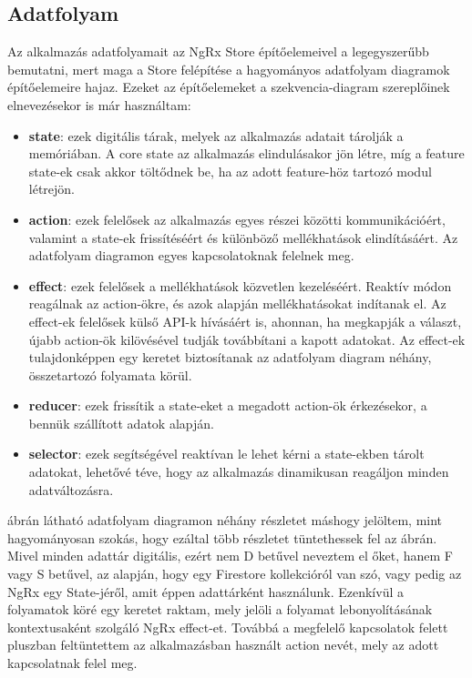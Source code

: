 \documentclass[a4paper,12pt]{report}
\begin{document}
\subsection{Adatfolyam}

Az alkalmazás adatfolyamait az NgRx Store építőelemeivel a legegyszerűbb bemutatni, mert maga a Store felépítése a hagyományos adatfolyam diagramok építőelemeire hajaz. Ezeket az építőelemeket a szekvencia-diagram szereplőinek elnevezésekor is már használtam:
\begin{itemize}
    \item \textbf{state}: ezek digitális tárak, melyek az alkalmazás adatait tárolják a memóriában. A core state az alkalmazás elindulásakor jön létre, míg a feature state-ek csak akkor töltődnek be, ha az adott feature-höz tartozó modul létrejön.
    \item \textbf{action}: ezek felelősek az alkalmazás egyes részei közötti kommunikációért, valamint a state-ek frissítéséért és különböző mellékhatások elindításáért. Az adatfolyam diagramon egyes kapcsolatoknak felelnek meg.
    \item \textbf{effect}: ezek felelősek a mellékhatások közvetlen kezeléséért. Reaktív módon reagálnak az action-ökre, és azok alapján mellékhatásokat indítanak el. Az effect-ek felelősek külső API-k hívásáért is, ahonnan, ha megkapják a választ, újabb action-ök kilövésével tudják továbbítani a kapott adatokat. Az effect-ek tulajdonképpen egy keretet biztosítanak az adatfolyam diagram néhány, összetartozó folyamata körül.
    \item \textbf{reducer}: ezek frissítik a state-eket a megadott action-ök érkezésekor, a bennük szállított adatok alapján.
    \item \textbf{selector}: ezek segítségével reaktívan le lehet kérni a state-ekben tárolt adatokat, lehetővé téve, hogy az alkalmazás dinamikusan reagáljon minden adatváltozásra.
\end{itemize}

 ábrán látható adatfolyam diagramon néhány részletet máshogy jelöltem, mint hagyományosan szokás, hogy ezáltal több részletet tüntethessek fel az ábrán. Mivel minden adattár digitális, ezért nem D betűvel neveztem el őket, hanem F vagy S betűvel, az alapján, hogy egy Firestore kollekcióról van szó, vagy pedig az NgRx egy State-jéről, amit éppen adattárként használunk. Ezenkívül a folyamatok köré egy keretet raktam, mely jelöli a folyamat lebonyolításának kontextusaként szolgáló NgRx effect-et. Továbbá a megfelelő kapcsolatok felett pluszban feltüntettem az alkalmazásban használt action nevét, mely az adott kapcsolatnak felel meg.
\end{document}

